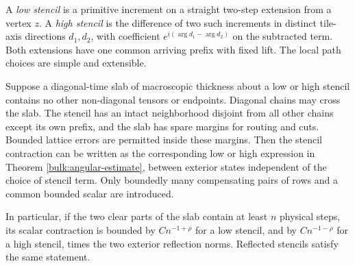 A \emph{low stencil} is a primitive increment on a straight
two-step extension from a vertex $z$. A \emph{high stencil} is
the difference of two such increments in distinct tile-axis
directions $d_1,d_2$, with coefficient
$e^{i(\arg d_1-\arg d_2)}$ on the subtracted term.
Both extensions have one common arriving prefix with fixed lift.
The local path choices are simple and extensible.

\begin{proposition}\label{cur:slab-estimate}
Suppose a diagonal-time slab of macroscopic thickness about a
low or high stencil contains no other non-diagonal tensors or
endpoints. Diagonal chains may cross the slab. The stencil has an
intact neighborhood disjoint from all other chains except its
own prefix, and the slab has spare margins for routing and cuts.
Bounded lattice errors are permitted inside these margins.
Then the stencil contraction can be written as the corresponding
low or high expression in Theorem \ref{bulk:angular-estimate},
between exterior states independent of the choice of stencil
term. Only boundedly many compensating pairs of rows and a
common bounded scalar are introduced.

In particular, if the two clear parts of the slab contain at
least $n$ physical steps, its scalar contraction is bounded by
$Cn^{-1+\rho}$ for a low stencil, and by $Cn^{-1-\rho}$ for a
high stencil, times the two exterior reflection norms. Reflected
stencils satisfy the same statement.
\end{proposition}

